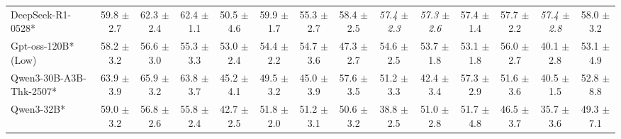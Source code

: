 \begin{table}[hbt]
{\begin{tabular}{l *{13}{c}}
 DeepSeek-R1-0528* &
59.8 {\tiny$\pm$ 2.7} &
62.3 {\tiny$\pm$ 2.4} &
62.4 {\tiny$\pm$ 1.1} &
50.5 {\tiny$\pm$ 4.6} &
59.9 {\tiny$\pm$ 1.7} &
55.3 {\tiny$\pm$ 2.7} &
58.4 {\tiny$\pm$ 2.5} &
\it{57.4} {\tiny$\pm$ 2.3} &
\it{57.3} {\tiny$\pm$ 2.6} &
57.4 {\tiny$\pm$ 1.4} &
57.7 {\tiny$\pm$ 2.2} &
\it{57.4} {\tiny$\pm$ 2.8} &
58.0 {\tiny$\pm$ 3.2} \\
  

\rowcolor{gray!10}
Gpt-oss-120B* (Low)&
58.2 {\tiny$\pm$ 3.2}&	
56.6 {\tiny$\pm$ 3.0}&	
55.3 {\tiny$\pm$ 3.3}&	
53.0 {\tiny$\pm$ 2.4}&	
54.4 {\tiny$\pm$ 2.2}&	
54.7 {\tiny$\pm$ 3.6}&	
47.3 {\tiny$\pm$ 2.7}&	
54.6 {\tiny$\pm$ 2.5}&	
53.7 {\tiny$\pm$ 1.8}&	
53.1 {\tiny$\pm$ 1.8}&	
56.0 {\tiny$\pm$ 2.7}&	
40.1 {\tiny$\pm$ 2.8}&	
53.1 {\tiny$\pm$ 4.9}\\	


Qwen3-30B-A3B-Thk-2507* &
63.9 {\tiny$\pm$ 3.9} &
65.9 {\tiny$\pm$ 3.2} &
63.8 {\tiny$\pm$ 3.7} &
45.2 {\tiny$\pm$ 4.1} &
49.5 {\tiny$\pm$ 3.2} &
45.0 {\tiny$\pm$ 3.9} &
57.6 {\tiny$\pm$ 3.5} &
51.2 {\tiny$\pm$ 3.3} &
42.4 {\tiny$\pm$ 3.4} &
57.3 {\tiny$\pm$ 2.9} &
51.6 {\tiny$\pm$ 3.6} &
40.5 {\tiny$\pm$ 1.5} &
52.8 {\tiny$\pm$ 8.8} \\
 
\rowcolor{gray!10}
Qwen3-32B* &
59.0 {\tiny$\pm$ 3.2} &
56.8 {\tiny$\pm$ 2.6} &
55.8 {\tiny$\pm$ 2.4} &
42.7 {\tiny$\pm$ 2.5} &
51.8 {\tiny$\pm$ 2.0} &
51.2 {\tiny$\pm$ 3.1} &
50.6 {\tiny$\pm$ 3.2} &
38.8 {\tiny$\pm$ 2.5} &
51.0 {\tiny$\pm$ 2.8} &
51.7 {\tiny$\pm$ 4.8} &
46.5 {\tiny$\pm$ 3.7} &
35.7 {\tiny$\pm$ 3.6} &
49.3 {\tiny$\pm$ 7.1} \\




\end{tabular}}
\end{table}
